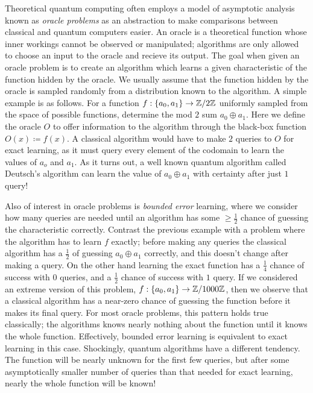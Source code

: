 \documentclass[12pt,twoside]{reedthesis}
\theoremstyle{plain}   %
\theoremstyle{definition}
\theoremstyle{remark}
\numberwithin{equation}{section}
\begin{document}
  Theoretical quantum computing often employs a model
  of asymptotic analysis known as \emph{oracle problems} as an abstraction to make comparisons between classical and quantum computers easier.
  An oracle is a theoretical function whose inner workings cannot be observed or manipulated; algorithms are only allowed to choose an input to the oracle and recieve its output.
  The goal when given an oracle problem is to create an algorithm which learns a given characteristic of the function hidden by the oracle.
  We usually assume that the function hidden by the oracle is sampled randomly from a distribution known to the algorithm.
  A simple example is as follows. For a function $f: \{a_0, a_1 \} \to \mathbb{Z} / 2\mathbb{Z}$ uniformly sampled from the space of possible functions, determine the mod $2$ sum $a_0 \oplus a_1$.
  Here we define the oracle $O$ to offer information to the algorithm through the black-box function $O(x) \coloneq f(x)$.
  A classical algorithm would have to make $2$ queries to $O$ for exact learning, as it must query every element of the codomain to learn the values of $a_o$ and $a_1$.
  As it turns out, a well known quantum algorithm called Deutsch's algorithm can learn the value of $a_0 \oplus a_1$ with certainty after just $1$ query! \par
  Also of interest in oracle problems is \emph{bounded error} learning, where we consider how many queries are needed until an algorithm has some $\geq \frac{1}{2}$ chance of guessing the characteristic correctly.
  Contrast the previous example with a problem where the algorithm has to learn $f$ exactly; before making any queries the classical algorithm has a $\frac{1}{2}$ of guessing $a_0 \oplus a_1$ correctly,
  and this doesn't change after making a query. On the other hand learning the exact function has a $\frac{1}{4}$ chance of success with $0$ queries, and a $\frac{1}{2}$ chance of success with $1$ query.
  If we considered an extreme version of this problem, $f: \{a_0, a_1 \} \to \mathbb{Z} / 1000\mathbb{Z}$, then we observe that a classical algorithm has a near-zero chance of guessing the function before it makes its final query.
  For most oracle problems, this pattern holds true classically; the algorithms knows nearly nothing about the function until it knows the whole function.
  Effectively, bounded error learning is equivalent to exact learning in this case.
  Shockingly, quantum algorithms have a different tendency.
  The function will be nearly unknown for the first few queries, but after some asymptotically smaller number of queries than that needed for exact learning, nearly the whole function will be known!
\end{document}
